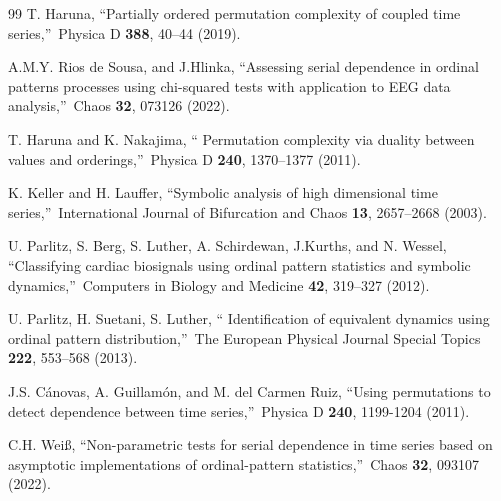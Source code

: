 \documentclass[%
 aip,
 amsmath,amssymb,
 reprint,%
]{revtex4-1}
\begin{document}
\begin{thebibliography}{99}
 T. Haruna, \textquotedblleft Partially ordered
permutation complexity of coupled time series,\textquotedblright\ Physica D 
\textbf{388}, 40--44 (2019).

 A.M.Y. Rios de Sousa, and J.Hlinka,
\textquotedblleft Assessing serial dependence in ordinal patterns processes
using chi-squared tests with application to EEG data
analysis,\textquotedblright\ Chaos \textbf{32}, 073126 (2022).

 T. Haruna and K. Nakajima, \textquotedblleft
Permutation complexity via duality between values and
orderings,\textquotedblright\ Physica D \textbf{240}, 1370--1377 (2011).

 K. Keller and H. Lauffer, \textquotedblleft Symbolic
analysis of high dimensional time series,\textquotedblright\ International
Journal of Bifurcation and Chaos \textbf{13}, 2657--2668 (2003).

 U. Parlitz, S. Berg, S. Luther, A. Schirdewan,
J.Kurths, and N. Wessel, \textquotedblleft Classifying cardiac biosignals
using ordinal pattern statistics and symbolic dynamics,\textquotedblright\
Computers in Biology and Medicine \textbf{42}, 319--327 (2012).



 U. Parlitz, H. Suetani, S. Luther, \textquotedblleft
Identification of equivalent dynamics using ordinal pattern
distribution,\textquotedblright\ The European Physical Journal Special
Topics \textbf{222}, 553--568 (2013).

 J.S. C\'{a}novas, A. Guillam\'{o}n, and M. del Carmen
Ruiz, \textquotedblleft Using permutations to detect dependence between time
series,\textquotedblright\ Physica D \textbf{240}, 1199-1204 (2011).

 C.H. Wei\ss , \textquotedblleft Non-parametric tests for
serial dependence in time series based on asymptotic implementations of
ordinal-pattern statistics,\textquotedblright\ Chaos \textbf{32}, 093107
(2022).


\end{thebibliography}
\end{document}
